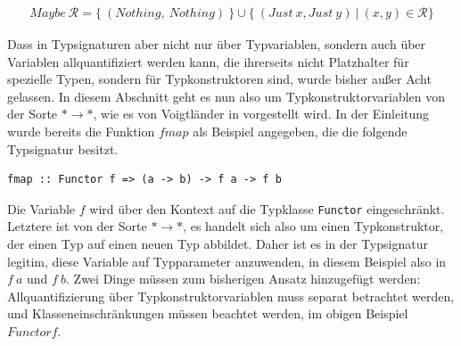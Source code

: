 \begin{align*}
Maybe\ \mathcal{R} = \{~(Nothing,\ Nothing)~\} \cup \{~(Just\ x, Just\ y)~|~(x, y) \in \mathcal{R} \}
\end{align*}

Dass in Typsignaturen aber nicht nur über Typvariablen, sondern auch über Variablen allquantifiziert werden kann, die
ihrerseits nicht Platzhalter für spezielle Typen, sondern für Typkonstruktoren sind, wurde bisher außer Acht gelassen. In diesem
Abschnitt geht es nun also um Typkonstruktorvariablen von der Sorte $* \rightarrow *$, wie es von Voigtländer in \cite{voigtlander}
vorgestellt wird. In der Einleitung wurde bereits die Funktion $fmap$ als Beispiel angegeben, die die folgende Typsignatur besitzt.



\begin{verbatim}
fmap :: Functor f => (a -> b) -> f a -> f b
\end{verbatim}

Die Variable $f$ wird über den Kontext auf die Typklasse \texttt{Functor} eingeschränkt. Letztere ist von der Sorte $* \rightarrow *$,
es handelt sich also um einen Typkonstruktor, der einen Typ auf einen neuen Typ abbildet.
Daher ist es in der Typsignatur legitim, diese Variable auf Typparameter anzuwenden, in diesem Beispiel also in $f\ a$ und $f\ b$.
Zwei Dinge müssen zum bisherigen Ansatz hinzugefügt werden: Allquantifizierung über Typkonstruktorvariablen muss separat betrachtet werden,
und Klasseneinschränkungen müssen beachtet werden, im obigen Beispiel $Functor f$.

